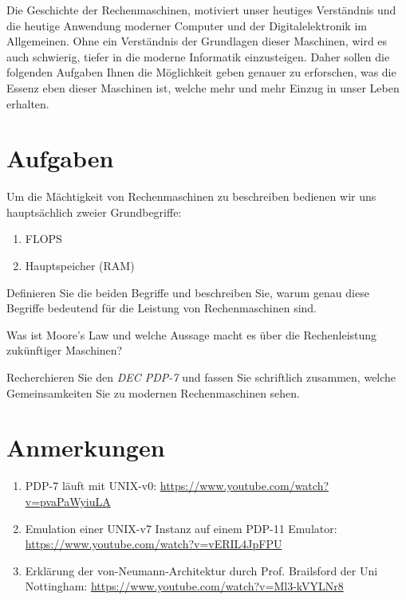 \documentclass{dcbl/challenge}
\begin{document}
Die Geschichte der Rechenmaschinen, motiviert unser heutiges Verständnis und die heutige Anwendung moderner Computer und der Digitalelektronik im Allgemeinen. 
Ohne ein Verständnis der Grundlagen dieser Maschinen, wird es auch schwierig, tiefer in die moderne Informatik einzusteigen.
Daher sollen die folgenden Aufgaben Ihnen die Möglichkeit geben genauer zu erforschen, was die Essenz eben dieser Maschinen ist, welche mehr und mehr Einzug in unser Leben erhalten.

\section*{Aufgaben}
\begin{aufgabe}
    Um die Mächtigkeit von Rechenmaschinen zu beschreiben bedienen wir uns hauptsächlich zweier Grundbegriffe:
    \begin{enumerate}
        \item FLOPS
        \item Hauptspeicher (RAM)
    \end{enumerate}
    Definieren Sie die beiden Begriffe und beschreiben Sie, warum genau diese Begriffe bedeutend für die Leistung von Rechenmaschinen sind.
\end{aufgabe}

\begin{aufgabe}
    Was ist Moore's Law und welche Aussage macht es über die Rechenleistung zukünftiger Maschinen?
\end{aufgabe}

\begin{aufgabe}
    Recherchieren Sie den \textit{DEC PDP-7} und fassen Sie schriftlich zusammen, welche Gemeinsamkeiten Sie zu modernen Rechenmaschinen sehen.
\end{aufgabe}

\section*{Anmerkungen}
\begin{enumerate}
    \item PDP-7 läuft mit UNIX-v0: \url{https://www.youtube.com/watch?v=pvaPaWyiuLA}
    \item Emulation einer UNIX-v7 Instanz auf einem PDP-11 Emulator: \url{https://www.youtube.com/watch?v=vERIL4JpFPU}
    \item Erklärung der von-Neumann-Architektur durch Prof. Brailsford der Uni Nottingham: \url{https://www.youtube.com/watch?v=Ml3-kVYLNr8}
\end{enumerate}
\end{document}
